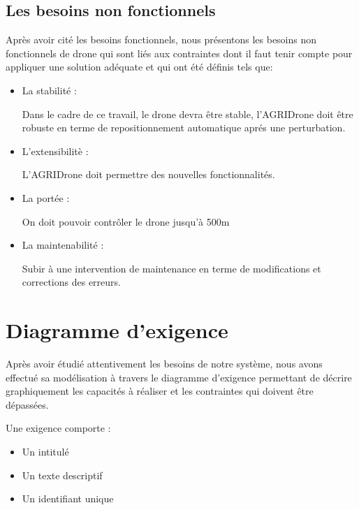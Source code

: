 	\subsection{Les besoins non fonctionnels}
	Après avoir cité les besoins fonctionnels, nous présentons
	les besoins non fonctionnels de drone qui sont liés aux contraintes dont il faut tenir compte pour appliquer une solution adéquate et qui ont été définis tels que:
	\begin{itemize}
		\item La stabilité :
		
		
		Dans le cadre de ce travail, le drone devra être stable, l'AGRIDrone doit être robuste en terme de repositionnement automatique aprés une perturbation.	
		
		\item L'extensibilitè : 
		
		
		L'AGRIDrone doit permettre des nouvelles fonctionnalités.
		
		\item La portée : 
		
		
		On doit pouvoir contrôler le drone jusqu'à 500m
		
		
		\item La maintenabilité : 
		
		Subir à une intervention de maintenance en terme de modifications et corrections des erreurs.
		\end {itemize}
		\section{Diagramme d'exigence }
		Après avoir étudié attentivement les besoins de  notre système, nous avons effectué sa modélisation à travers le diagramme d'exigence permettant de décrire graphiquement les capacités à réaliser et les contraintes qui doivent être dépassées.
		
    	Une exigence comporte : 
		\begin{itemize}
			\item Un intitulé 
			
			\item Un texte descriptif 
			
			\item Un identifiant unique
		\end{itemize}
		
